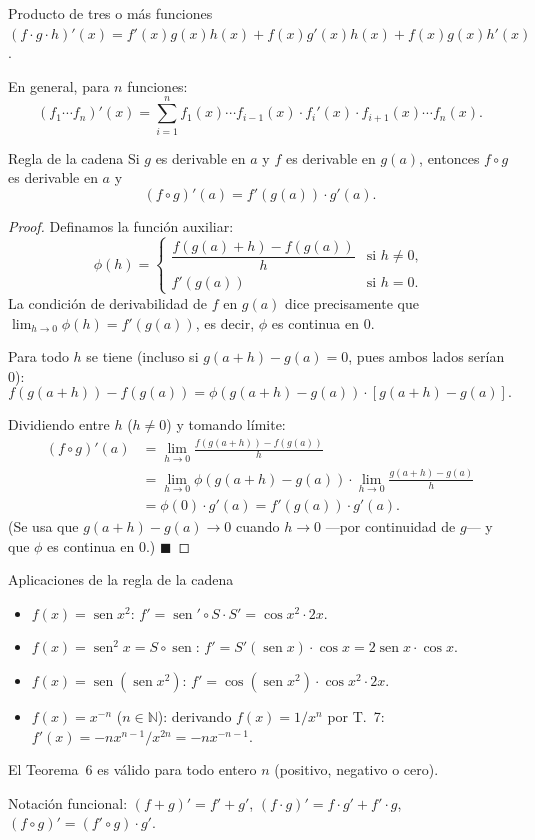 \documentclass[12pt]{article}
\begin{document}
\begin{nota}[]{Producto de tres o más funciones}
$(f\cdot g\cdot h)'(x) = f'(x)g(x)h(x) + f(x)g'(x)h(x) + f(x)g(x)h'(x)$.

En general, para $n$ funciones:
\[ (f_1 \cdots f_n)'(x) = \sum_{i=1}^n f_1(x)\cdots f_{i-1}(x)\cdot f_i'(x)\cdot f_{i+1}(x)\cdots f_n(x). \]
\end{nota}

\begin{teorema}[9]{Regla de la cadena}
Si $g$ es derivable en $a$ y $f$ es derivable en $g(a)$, entonces $f \circ g$ es derivable en $a$ y
\[ (f \circ g)'(a) = f'(g(a))\cdot g'(a). \]
\end{teorema}

\begin{proof}
Definamos la función auxiliar:
\[
\phi(h) = \begin{cases}
\dfrac{f(g(a)+h) - f(g(a))}{h} & \text{si } h \neq 0, \\[6pt]
f'(g(a)) & \text{si } h = 0.
\end{cases}
\]
La condición de derivabilidad de $f$ en $g(a)$ dice precisamente que $\lim_{h\to 0}\phi(h) = f'(g(a))$, es decir, $\phi$ es continua en $0$.

Para todo $h$ se tiene (incluso si $g(a+h)-g(a)=0$, pues ambos lados serían $0$):
\[ f(g(a+h)) - f(g(a)) = \phi(g(a+h)-g(a))\cdot[g(a+h)-g(a)]. \]

Dividiendo entre $h$ ($h\neq 0$) y tomando límite:
\begin{align*}
(f\circ g)'(a) &= \lim_{h\to 0}\frac{f(g(a+h))-f(g(a))}{h} \\
&= \lim_{h\to 0}\phi(g(a+h)-g(a))\cdot\lim_{h\to 0}\frac{g(a+h)-g(a)}{h} \\
&= \phi(0)\cdot g'(a) = f'(g(a))\cdot g'(a).
\end{align*}
(Se usa que $g(a+h)-g(a)\to 0$ cuando $h\to 0$ —por continuidad de $g$— y que $\phi$ es continua en $0$.)
$\blacksquare$
\end{proof}

\begin{nota}[]{Aplicaciones de la regla de la cadena}
\begin{itemize}
  \item $f(x) = \operatorname{sen}x^2$: $f' = \operatorname{sen}'\circ S\cdot S' = \cos x^2\cdot 2x$.
  \item $f(x) = \operatorname{sen}^2 x = S\circ\operatorname{sen}$: $f' = S'(\operatorname{sen}x)\cdot\cos x = 2\operatorname{sen}x\cdot\cos x$.
  \item $f(x) = \operatorname{sen}(\operatorname{sen}x^2)$: $f' = \cos(\operatorname{sen}x^2)\cdot\cos x^2\cdot 2x$.
  \item $f(x) = x^{-n}$ ($n\in\mathbb{N}$): derivando $f(x) = 1/x^n$ por T.~7: $f'(x) = -nx^{n-1}/x^{2n} = -nx^{-n-1}$.
\end{itemize}
El Teorema~6 es válido para todo entero $n$ (positivo, negativo o cero).

\medskip
Notación funcional: $(f+g)' = f'+g'$, $(f\cdot g)' = f\cdot g' + f'\cdot g$, $(f\circ g)' = (f'\circ g)\cdot g'$.
\end{nota}
\end{document}
